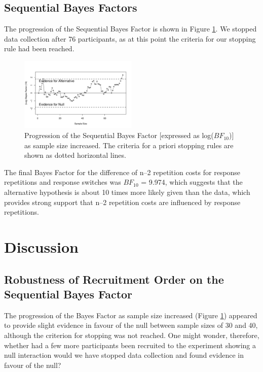 \documentclass[a4paper, jou, natbib]{apa6}
\begin{document}
\subsection{Sequential Bayes Factors}
The progression of the Sequential Bayes Factor is shown in Figure \ref{fig:bayesFactor}. We stopped data collection after 76 participants, as at this point the criteria for our stopping rule had been reached. 

\begin{figure}
\begin{center}
\includegraphics[width = 0.5\textwidth]{Images/bayesFactor.pdf}
\caption{Progression of the Sequential Bayes Factor [expressed as log($BF_{10}$)] as sample size increased. The criteria for a priori stopping rules are shown as dotted horizontal lines.}
\label{fig:bayesFactor}
\end{center}
\end{figure}

The final Bayes Factor for the difference of n--2 repetition costs for response repetitions and response switches was $BF_{10}$ = 9.974, which suggests that the alternative hypothesis is about 10 times more likely given than the data, which provides strong support that n--2 repetition costs are influenced by response repetitions.





\section{Discussion}

\subsection{Robustness of Recruitment Order on the Sequential Bayes Factor}
The progression of the Bayes Factor as sample size increased (Figure \ref{fig:bayesFactor}) appeared to provide slight evidence in favour of the null between sample sizes of 30 and 40, although the criterion for stopping was not reached. One might wonder, therefore, whether had a few more participants been recruited to the experiment showing a null interaction would we have stopped data collection and found evidence in favour of the null?
\end{document}
